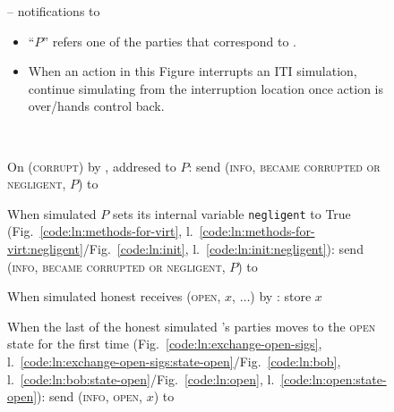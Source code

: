 \begin{figure}[H]
  \begin{simulatorbox}{\simulator{} -- notifications to \fchan}
    \begin{itemize}
      \item ``$P$'' refers one of the parties that correspond to \fchan.
      \item When an action in this Figure interrupts an ITI simulation, continue
      simulating from the interruption location once action is over/\fchan hands
      control back.
    \end{itemize} \ \\
    \begin{algorithmic}[1]
      \State On (\textsc{corrupt}) by \adversary, addresed to $P$:
      \Indent
        \State {}
        \State send (\textsc{info}, \textsc{became corrupted or negligent}, $P$)
        to \fchan
        \label{code:simulator:corrupted}
      \EndIndent
      \Statex

      \State When simulated $P$ sets its internal variable \texttt{negligent} to
      True (Fig.~\ref{code:ln:methods-for-virt},
      l.~\ref{code:ln:methods-for-virt:negligent}/Fig.~\ref{code:ln:init},
      l.~\ref{code:ln:init:negligent}):
      \Indent
        \State send (\textsc{info}, \textsc{became corrupted or negligent}, $P$)
        to \fchan
        \label{code:simulator:negligent}
      \EndIndent
      \Statex

      \State When simulated honest \alice receives (\textsc{open}, $x$, $\dots$)
      by \environment:
      \Indent
        \State store $x$ 
      \EndIndent
      \Statex

      \State When the last of the honest simulated \fchan's parties moves to the
      \textsc{open} state for the first time
      (Fig.~\ref{code:ln:exchange-open-sigs},
      l.~\ref{code:ln:exchange-open-sigs:state-open}/Fig.~\ref{code:ln:bob},
      l.~\ref{code:ln:bob:state-open}/Fig.~\ref{code:ln:open},
      l.~\ref{code:ln:open:state-open}):
      \label{code:simulator:when-open}
      \Indent
         
        \State send (\textsc{info}, \textsc{open}, $x$) to \fchan
        \label{code:simulator:open}
      \EndIndent
      \Statex


\end{algorithmic}
\end{simulatorbox}
\end{figure}
